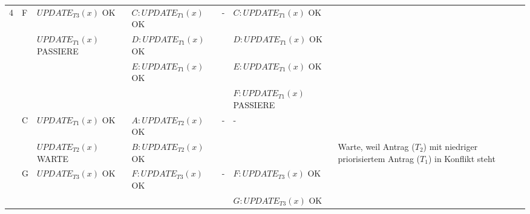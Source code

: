 \documentclass[a4paper, landscape]{article}
\begin{document}
\begin{tabular}{| l | l | l | l | l | l | p{6cm} |}
4 & \multirow{4}{*}{F} 
			&	$UPDATE_{T3}(x)$ OK 					 & $C: UPDATE_{T1}(x)$ OK	& - &	 $C: UPDATE_{T1}(x)$ OK &\\
			& &$UPDATE_{T1}(x)$ PASSIERE & $D: UPDATE_{T1}(x)$ OK &   &		 $D: UPDATE_{T1}(x)$ OK &\\
			& &																	   	& $E: UPDATE_{T1}(x)$ OK& 	& 	 $E: UPDATE_{T1}(x)$ OK & \\
			& &																	   	& 															& 	& 	 $F: UPDATE_{T1}(x)$ PASSIERE & \\
\cline{2-7}
& \multirow{2}{*}{C} 
			&   $UPDATE_{T1}(x)$ OK 		& $A: UPDATE_{T2}(x)$ OK	& - &	 -  &\\
			&& $UPDATE_{T2}(x)$ WARTE   &  $B: UPDATE_{T2}(x)$ OK  &   &	  & Warte, weil Antrag ($T_2$) mit niedriger priorisiertem Antrag ($T_1$) in Konflikt steht\\
\cline{2-7}
& \multirow{2}{*}{G} 
			&   $UPDATE_{T3}(x)$ OK 		& $F: UPDATE_{T3}(x)$ OK	& - &	$F: UPDATE_{T3}(x)$ OK &\\
			&& 															   & 															   &    & $G: UPDATE_{T3}(x)$ OK  & \\
\hline
\end{tabular}
\newpage
\end{document}
